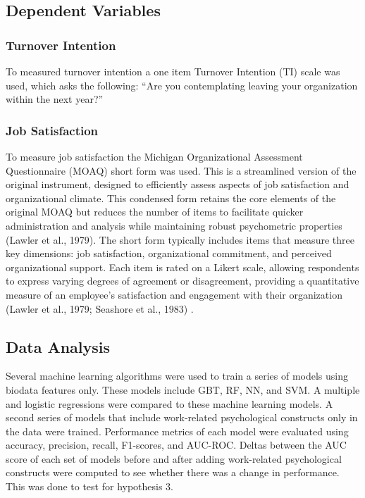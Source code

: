\documentclass[
  man]{apa7}
\begin{document}
\hypertarget{dependent-variables}{%
\subsection{Dependent Variables}\label{dependent-variables}}

\hypertarget{turnover-intention-1}{%
\subsubsection{Turnover Intention}\label{turnover-intention-1}}

To measured turnover intention a one item Turnover Intention (TI) scale was used, which asks the following: ``Are you contemplating leaving your organization within the next year?''

\hypertarget{job-satisfaction}{%
\subsubsection{Job Satisfaction}\label{job-satisfaction}}

To measure job satisfaction the Michigan Organizational Assessment Questionnaire (MOAQ) short form was used. This is a streamlined version of the original instrument, designed to efficiently assess aspects of job satisfaction and organizational climate. This condensed form retains the core elements of the original MOAQ but reduces the number of items to facilitate quicker administration and analysis while maintaining robust psychometric properties (Lawler et al., 1979). The short form typically includes items that measure three key dimensions: job satisfaction, organizational commitment, and perceived organizational support. Each item is rated on a Likert scale, allowing respondents to express varying degrees of agreement or disagreement, providing a quantitative measure of an employee's satisfaction and engagement with their organization (Lawler et al., 1979; Seashore et al., 1983) .

\hypertarget{data-analysis-1}{%
\subsection{Data Analysis}\label{data-analysis-1}}

Several machine learning algorithms were used to train a series of models using biodata features only. These models include GBT, RF, NN, and SVM. A multiple and logistic regressions were compared to these machine learning models. A second series of models that include work-related psychological constructs only in the data were trained. Performance metrics of each model were evaluated using accuracy, precision, recall, F1-scores, and AUC-ROC. Deltas between the AUC score of each set of models before and after adding work-related psychological constructs were computed to see whether there was a change in performance. This was done to test for hypothesis 3.
\end{document}
